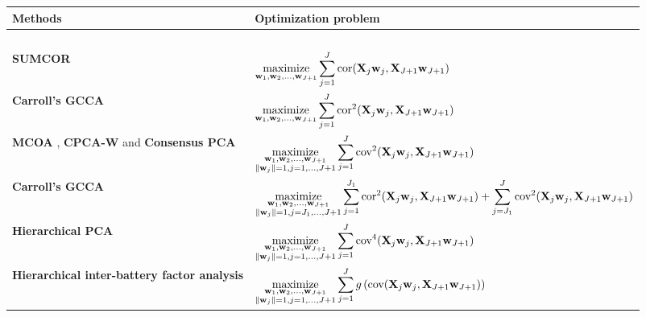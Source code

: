 \documentclass[
]{jss}
\begin{document}
\begin{landscape}
\begin{table}[!ht]
\centering
\begin{tabular}{p{7cm}p{13cm}}
\hline
\textbf{Methods} & \textbf{Optimization problem} \\
\hline
~\\
\textbf{SUMCOR} \citep{Horst1961} & 
$ \underset{\mathbf{w}_1, \mathbf{w}_2, \ldots,\mathbf{w}_{J+1}}{\text{maximize}} \displaystyle \sum_{j=1}^J \text{cor}(\mathbf{X}_j\mathbf{w}_j, \mathbf{X}_{J+1}\mathbf{w}_{J+1}) $ \\

\textbf{Carroll's GCCA} \citep{Carroll1968a} &  $ \underset{\mathbf{w}_1, \mathbf{w}_2, \ldots,\mathbf{w}_{J+1}}{\text{maximize}} \displaystyle \sum_{j=1}^J \text{cor}^2(\mathbf{X}_j\mathbf{w}_j, \mathbf{X}_{J+1}\mathbf{w}_{J+1}) $\\

\textbf{MCOA} \citep{Chessel1996}, \textbf{CPCA-W} \citep{Smilde2003} and \textbf{Consensus PCA} \citep{Westerhuis1998} &
  $ \underset{\substack{\mathbf{w}_1, \mathbf{w}_2, \ldots,\mathbf{w}_{J+1} \\ \Vert \mathbf{w}_j \Vert =1, j = 1, \ldots, J+1}}{\text{maximize}} \displaystyle \sum_{j=1}^J \text{cov}^2(\mathbf{X}_j\mathbf{w}_j, \mathbf{X}_{J+1}\mathbf{w}_{J+1}) $\\

\textbf{Carroll's GCCA} \citep{Carroll1968b} &   
$ \underset{\substack{\mathbf{w}_1, \mathbf{w}_2, \ldots,\mathbf{w}_{J+1} \\ \Vert \mathbf{w}_j \Vert =1, j = J_1, \ldots, J+1}}{\text{maximize}} \displaystyle \sum_{j=1}^{J_1} \text{cor}^2(\mathbf{X}_j\mathbf{w}_j, \mathbf{X}_{J+1}\mathbf{w}_{J+1}) + \sum_{j=J_1}^{J} \text{cov}^2(\mathbf{X}_j\mathbf{w}_j, \mathbf{X}_{J+1}\mathbf{w}_{J+1}) $\\

\textbf{Hierarchical PCA} \citep{Smilde2003} &  
$ \underset{\substack{\mathbf{w}_1, \mathbf{w}_2, \ldots,\mathbf{w}_{J+1} \\ \Vert \mathbf{w}_j \Vert =1, j = 1, \ldots, J+1}}{\text{maximize}} \displaystyle \sum_{j=1}^J \text{cov}^4(\mathbf{X}_j\mathbf{w}_j, \mathbf{X}_{J+1}\mathbf{w}_{J+1}) $\\

\textbf{Hierarchical inter-battery factor analysis} \citep{Tenenhaus2011}& 
$ \underset{\substack{\mathbf{w}_1, \mathbf{w}_2, \ldots,\mathbf{w}_{J+1} \\ \Vert \mathbf{w}_j \Vert =1, j = 1, \ldots, J+1}}{\text{maximize}} \displaystyle \sum_{j=1}^J g \left(\text{cov}(\mathbf{X}_j\mathbf{w}_j, \mathbf{X}_{J+1}\mathbf{w}_{J+1})\right) $\\


\end{tabular}
\end{table}
\end{landscape}
\end{document}
